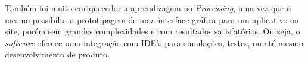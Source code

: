 \documentclass[11pt, a4paper, twocolumn]{article}
\begin{document}
Também foi muito enriquecedor a aprendizagem no \textit{Processing}, uma vez que o mesmo possibilta a prototipagem de uma interface gráfica para um aplicativo ou site, porém sem 
grandes complexidades e com resultados satisfatórios. Ou seja, o \textit{software} oferece uma integração com IDE's para simulações, testes, ou até mesmo desenvolvimento de produto.
\end{document}
